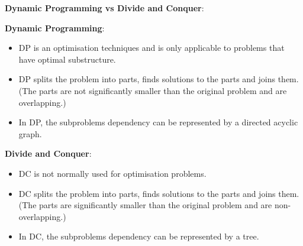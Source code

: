 \documentclass[onecolumn]{report}
\begin{document}
\noindent
\clearpage
\noindent
\textbf{Dynamic Programming vs Divide and Conquer}:
\begin{multicols}{2}
\noindent
\textbf{Dynamic Programming}:
\begin{itemize}
    \item DP is an optimisation techniques and is only applicable to problems that have optimal substructure.
    \item DP splits the problem into parts, finds solutions to the parts and joins them.(The parts are not significantly smaller than the original problem and are overlapping.)
    \item In DP, the subproblems dependency can be represented by a directed acyclic graph.
\end{itemize}
\columnbreak
\textbf{Divide and Conquer}:
\begin{itemize}
    \item DC is not normally used for optimisation problems.
    \item DC splits the problem into parts, finds solutions to the parts and joins them.(The parts are significantly smaller than the original problem and are non-overlapping.)
    \item In DC, the subproblems dependency can be represented by a tree.
\end{itemize}
\end{multicols}
\noindent
\end{document}
